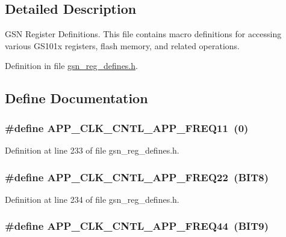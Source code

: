 \subsection{Detailed Description}
GSN Register Definitions. This file contains macro definitions for accessing various GS101x registers, flash memory, and related operations. 

Definition in file \hyperlink{a00546_source}{gsn\_\-reg\_\-defines.h}.



\subsection{Define Documentation}
\hypertarget{a00546_a73a6a6c6808a42d514ebb67c1063268e}{
\subsubsection[{APP\_\-CLK\_\-CNTL\_\-APP\_\-FREQ11}]{\setlength{\rightskip}{0pt plus 5cm}\#define APP\_\-CLK\_\-CNTL\_\-APP\_\-FREQ11~(0)}}
\label{a00546_a73a6a6c6808a42d514ebb67c1063268e}


Definition at line 233 of file gsn\_\-reg\_\-defines.h.

\hypertarget{a00546_a0cd1f0a0f83703beab3a59c5b2f64ad8}{
\subsubsection[{APP\_\-CLK\_\-CNTL\_\-APP\_\-FREQ22}]{\setlength{\rightskip}{0pt plus 5cm}\#define APP\_\-CLK\_\-CNTL\_\-APP\_\-FREQ22~(BIT8)}}
\label{a00546_a0cd1f0a0f83703beab3a59c5b2f64ad8}


Definition at line 234 of file gsn\_\-reg\_\-defines.h.

\hypertarget{a00546_ab49ba667ee7e8ca380e91ada4a135cfe}{
\subsubsection[{APP\_\-CLK\_\-CNTL\_\-APP\_\-FREQ44}]{\setlength{\rightskip}{0pt plus 5cm}\#define APP\_\-CLK\_\-CNTL\_\-APP\_\-FREQ44~(BIT9)}}
\label{a00546_ab49ba667ee7e8ca380e91ada4a135cfe}


